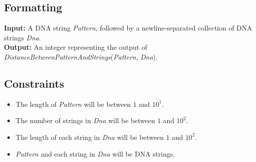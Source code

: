 \documentclass{article}
\begin{document}
\subsection*{Formatting}
\noindent\textbf{Input:} A DNA string \emph{Pattern}, followed by a newline-separated collection of DNA strings \emph{Dna}.\\
\noindent\textbf{Output:} An integer representing the output of \emph{DistanceBetweenPatternAndStrings}(\emph{Pattern}, \emph{Dna}).

\subsection*{Constraints}
\begin{itemize}
    \item The length of \emph{Pattern} will be between $1$ and $10^1$.
    \item The number of strings in \emph{Dna} will be between $1$ and $10^2$.
    \item The length of each string in \emph{Dna} will be between $1$ and $10^2$.
    \item \emph{Pattern} and each string in \emph{Dna} will be DNA strings.
\end{itemize}
\pagebreak
\end{document}
